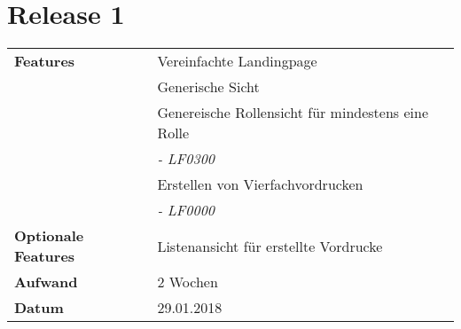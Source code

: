 \section*{Release 1 }
\label{sec:release_1}

\begin{tabular}{p{5cm}p{9cm}}
    \textbf{Features} & Vereinfachte Landingpage \\
    & Generische Sicht \\
    & Genereische Rollensicht für mindestens eine Rolle \\
    & \hspace{8pt} \textit{\footnotesize - LF0300} \\
    & Erstellen von Vierfachvordrucken \\
    & \hspace{8pt} \textit{\footnotesize - LF0000} \\
    \textbf{Optionale Features} & Listenansicht für erstellte Vordrucke \\
    \hline
    \textbf{Aufwand} & 2 Wochen \\
    \hline
    \textbf{Datum} & 29.01.2018
\end{tabular}